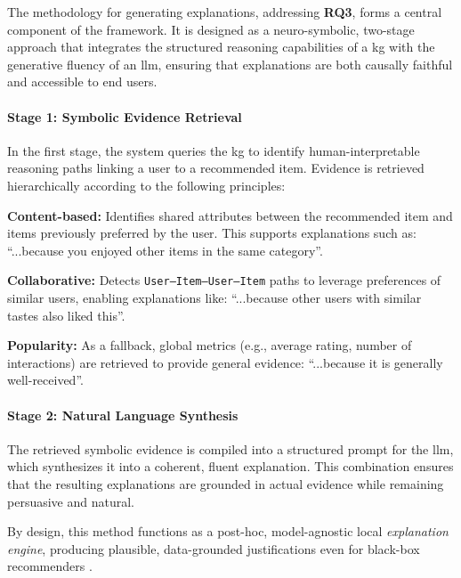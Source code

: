 The methodology for generating explanations, addressing \textbf{RQ3}, forms a central component of the framework. It is designed as a neuro-symbolic, two-stage approach that integrates the structured reasoning capabilities of a \ac{kg} with the generative fluency of an \ac{llm}, ensuring that explanations are both causally faithful and accessible to end users.

\paragraph{Stage 1: Symbolic Evidence Retrieval}
In the first stage, the system queries the \ac{kg} to identify human-interpretable reasoning paths linking a user to a recommended item. Evidence is retrieved hierarchically according to the following principles:

\begin{compactitem}[\textbullet]
\item \textbf{Content-based:} Identifies shared attributes between the recommended item and items previously preferred by the user. This supports explanations such as: ``...because you enjoyed other items in the same category''.
\item \textbf{Collaborative:} Detects \texttt{User–Item–User–Item} paths to leverage preferences of similar users, enabling explanations like: ``...because other users with similar tastes also liked this''.
\item \textbf{Popularity:} As a fallback, global metrics (e.g., average rating, number of interactions) are retrieved to provide general evidence: ``...because it is generally well-received''.
\end{compactitem}

\paragraph{Stage 2: Natural Language Synthesis}
The retrieved symbolic evidence is compiled into a structured prompt for the \ac{llm}, which synthesizes it into a coherent, fluent explanation. This combination ensures that the resulting explanations are grounded in actual evidence while remaining persuasive and natural.

By design, this method functions as a post-hoc, model-agnostic local \textit{explanation engine}, producing plausible, data-grounded justifications even for black-box recommenders \cite{SOTA-RECSYS-EXPLAIN-KG, SOTA-MODEL-AGNOSTIC-GRAPH-EXPLANATIONS}.